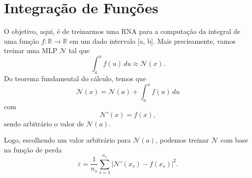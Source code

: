 \section{Integração de Funções}\label{cap_pinns_sec_integr}
\badgeConstrucao

O objetivo, aqui, é de treinarmos uma RNA para a computação da integral de uma função $f:\mathbb{R}\to\mathbb{R}$ em um dado intervalo [a, b]. Mais precisamente, vamos treinar uma MLP $\mathcal{N}$ tal que
\begin{equation}
  \int_a^x f(u)\,du \approx \mathcal{N}(x).
\end{equation}
Do teorema fundamental do cálculo, temos que
\begin{equation}
  \mathcal{N}(x) = \mathcal{N}(a) + \int_{a}^x f(u)\,du
\end{equation}
com
\begin{equation}
  \mathcal{N}'(x) = f(x),
\end{equation}
sendo arbitrário o valor de $\mathcal{N}(a)$.

Logo, escolhendo um valor arbitrário para $\mathcal{N}(a)$, podemos treinar $\mathcal{N}$ com base na função de perda
\begin{equation}
  \varepsilon = \frac{1}{n_s}\sum_{s=1}^{n_s}\left|\mathcal{N}'(x_s) - f(x_s)\right|^2.
\end{equation}

